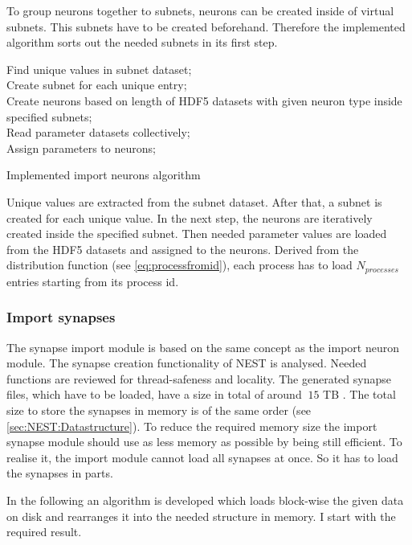 To group neurons together to subnets, neurons can be created inside of virtual subnets.
This subnets have to be created beforehand.
Therefore the implemented algorithm sorts out the needed subnets in its first step.
\begin{algorithm}[ht!]
 Find unique values in subnet dataset; \\
 Create subnet for each unique entry; \\
 Create neurons based on length of HDF5 datasets with given neuron type inside specified subnets; \\
 Read parameter datasets collectively; \\
 Assign parameters to neurons;
\label{alg2}
\caption{Implemented import neurons algorithm}
\end{algorithm}
Unique values are extracted from the subnet dataset.
After that, a subnet is created for each unique value. 
In the next step, the neurons are iteratively created inside the specified subnet.
Then needed parameter values are loaded from the HDF5 datasets and assigned to the neurons.
Derived from the distribution function (see \ref{eq:processfromid}), each process has to load $N_{processes}$
entries starting from its process id.

\newpage
\subsubsection{Import synapses}
The synapse import module is based on the same concept as the import neuron module.
The synapse creation functionality of NEST is analysed.
Needed functions are reviewed for thread-safeness and locality.
The generated synapse files, which have to be loaded, have a size in total of around $~15$ TB .
The total size to store the synapses in memory is of the same order (see \ref{sec:NEST:Datastructure}).
To reduce the required memory size the import synapse module should use as less memory
as possible by being still efficient.
To realise it, the import module cannot load all synapses at once.
So it has to load the synapses in parts.

In the following an algorithm is developed which loads block-wise the given data on disk and rearranges it into
the needed structure in memory. I start with the required result.

